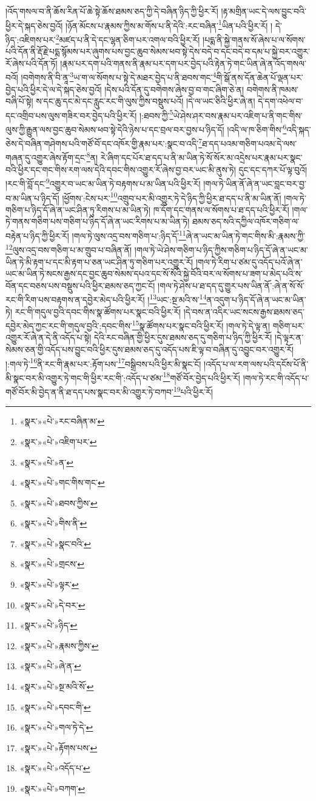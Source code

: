 །འོད་གསལ་བ་ནི་ཆོས་རིན་པོ་ཆེ་སྟེ་ཆོས་ཐམས་ཅད་ཀྱི་དེ་བཞིན་ཉིད་ཀྱི་ཕྱིར་རོ། །རྟ་མགྲིན་ཡང་དེ་ལས་བྱུང་བའི་ཕྱིར་དེ་སྐད་ཅེས་བྱའོ། །ཉོན་མོངས་པ་རྣམས་ཀྱིས་མ་གོས་པ་ནི་དེའི་:རང་བཞིན་\footnote{«སྣར་»«པེ་»རང་བཞིན་མ་}ཡིན་པའི་ཕྱིར་རོ། །
དེ་ཉིད་:འཇིགས་པར་\footnote{«སྣར་»«པེ་»འཇིག་པར་}མཛད་པ་ནི་དེ་དང་ལྷན་ཅིག་པར་འགལ་བའི་ཕྱིར་རོ། །པདྨ་ནི་སྐྱེ་གནས་སོ་ཞེས་པ་ལ་སོགས་པའི་དོན་ནི་རྡོ་རྗེ་པདྨ་སྙོམས་པར་ཞུགས་པས་བྱང་ཆུབ་སེམས་ཕབ་སྟེ་དེས་བདེ་བ་དང་བདེ་བ་དམ་པ་སྐྱེ་བར་འགྱུར་རོ་ཞེས་པའི་དོན་ཏོ། །རྣམ་པར་དག་པའི་གནས་ནི་རྣམ་པར་དག་པར་བྱེད་པའི་རྟེན་ཏེ་གང་ཡིན་ཞེ་ན་འོད་གསལ་བའོ། །བགེགས་ནི་བི་ནཱ་\footnote{«སྣར་»«པེ་»ན་}ཡ་ག་ལ་སོགས་པ་སྟེ་དེ་མཐར་བྱེད་པ་ནི་ཐབས་གང་\footnote{«སྣར་»«པེ་»གང་གིས་གང་}གི་སྒོ་ནས་དོན་ཆེན་པོ་ལྡན་པར་བྱེད་པའི་ཕྱིར་དེ་ལ་དེ་སྐད་ཅེས་བྱའོ། །དེས་པའི་དོན་དུ་བགེགས་ཞེས་བྱ་བ་གང་ཞིག་ཅེ་ན། བགེགས་ནི་ཁམས་བཞི་པོ་སྟེ། ས་དང་ཆུ་དང་མེ་དང་རླུང་རང་གི་ལུས་ཀྱིས་བསྡུས་པའོ། །དེ་ལ་ཡང་ཅིའི་ཕྱིར་ཞེ་ན། དེ་དག་འཕེལ་བ་དང་འགྲིབ་པས་ལུས་གཟིར་བར་བྱེད་པའི་ཕྱིར་རོ། །:ཐབས་ཀྱི་\footnote{«སྣར་»«པེ་»ཐབས་ཀྱིས་}ཡེ་ཤེས་ཤར་བས་རྣམ་པར་འཇིག་པ་ནི་གང་གིས་ལུས་ཀྱི་རྒྱུན་ལས་བྱང་ཆུབ་སེམས་ཕབ་སྟེ་དེའི་ཉེས་པ་དང་བྲལ་བར་བྱས་པ་ཉིད་དོ། །འདི་ལ་ཁ་ཅིག་གིས་\footnote{«སྣར་»«པེ་»གིས་ནི་}འདི་སྐད་ཅེས་དེ་བཞིན་གཤེགས་པའི་གཙོ་བོ་དང་འཁོར་གྱི་རྣམ་པར་:སྣང་བ་འདི་\footnote{«སྣར་»«པེ་»སྣང་བའི་}ཐ་དད་པའམ་གཅིག་པའམ་དེ་ལས་གཞན་དུ་འགྱུར་ཞེས་རྟོག་དྲང་\footnote{«སྣར་»«པེ་»གྲངས་}ན། རེ་ཞིག་དང་པོར་ཐ་དད་པ་ནི་མ་ཡིན་ཏེ་སོ་སོར་མ་འདྲེས་པར་རྣམ་པར་སྣང་བའི་ཕྱིར་དང་གང་གིས་རག་ལས་དེའི་དབང་གིས་འགྱུར་རོ་ཞེས་བྱ་བར་ཡང་མི་ནུས་ཏེ། དུང་དང་དཀར་པོ་ལྟ་བུའོ། །རང་གི་བློ་དང་\footnote{«སྣར་»«པེ་»ལྟར་}འགྱུར་བ་ཡང་མ་ཡིན་ཏེ་བརྟགས་པ་མ་ཡིན་པའི་ཕྱིར་རོ། །གལ་ཏེ་ཡིན་ནོ་ཞེ་ན་ཡང་བླང་བར་བྱ་བ་མ་ཡིན་པ་ཉིད་དོ། །ཕྱོགས་:ངེས་པར་\footnote{«སྣར་»«པེ་»དེ་བར་}འགྲུབ་པར་མི་འགྱུར་ཏེ་དེ་ཉིད་ཀྱི་ཕྱིར་ཐ་དད་པ་ནི་མ་ཡིན་ནོ། །གལ་ཏེ་གཅིག་པ་ཉིད་དོ་ཞེ་ན་ཡང་ཤིན་ཏུ་རིགས་པ་མ་ཡིན་ཏེ། ཁ་དོག་དང་གནས་ལ་སོགས་པ་ཐ་དད་པའི་ཕྱིར་རོ། །གལ་ཏེ་གནས་གཅིག་པས་གཅིག་པ་ཉིད་དོ་ཞེ་ན་ཡང་རིགས་པ་མ་ཡིན་ཏེ། ཐམས་ཅད་སའི་དཀྱིལ་འཁོར་གཅིག་ལ་བརྟེན་པ་ཉིད་ཀྱི་ཕྱིར་རོ། །གལ་ཏེ་ལུས་འདྲ་བས་གཅིག་པ་:ཉིད་དོ་\footnote{«སྣར་»«པེ་»ཉིད་}ཞེ་ན་ཡང་མ་ཡིན་ཏེ་གང་གིས་མི་:རྣམས་ཀྱི་\footnote{«སྣར་»«པེ་»རྣམས་ཀྱིས་}ལུས་འདྲ་བས་གཅིག་པ་མ་གྲུབ་པ་བཞིན་ནོ། །གལ་ཏེ་ཡེ་ཤེས་གཅིག་པ་ཉིད་ཀྱིས་གཅིག་པ་ཉིད་དོ་ཞེ་ན་ཡང་མ་ཡིན་ཏེ་མི་རྟག་པ་དང་མི་རྟག་པ་ཅན་ཡང་ཤིན་ཏུ་གཅིག་པར་འགྱུར་རོ། །གལ་ཏེ་རིག་པ་ཙམ་དུ་འདོད་པའོ་ཞེ་ན་ཡང་མ་ཡིན་ཏེ་སངས་རྒྱས་དང་བྱང་ཆུབ་སེམས་དཔའ་དང་སོ་སོའི་སྐྱེ་བོའི་བར་ལ་སོགས་པ་ཟག་པ་མེད་པའི་ས་བོན་དང་བཅས་པས་བསྡུས་པའི་ཕྱིར་ཐམས་ཅད་ཀྱང་ངོ། །གལ་ཏེ་ཤེས་པ་ཐ་དད་དུ་གྱུར་པས་ཡིན་ནོ་:ཞེ་ན་སོ་སོ་རང་གི་རིག་པས་བརྟགས་ན་དབྱེར་མེད་པའི་ཕྱིར་རོ། །\footnote{«སྣར་»«པེ་»ཞེ་ན་}ཡང་:སྔ་མའི་ས་\footnote{«སྣར་»«པེ་»སྔ་མའི་སོ་}ན་འདུག་པ་ཉིད་དོ་ཞེ་ན་ཡང་མ་ཡིན་ཏེ། རང་གི་གདུལ་བྱའི་དབང་གིས་སྣ་ཚོགས་པར་སྣང་བའི་ཕྱིར་རོ། །དེ་བས་ན་འདིར་ཡང་སངས་རྒྱས་ཐམས་ཅད་དབྱེར་མེད་ཀྱང་རང་གི་གདུལ་བྱའི་:དབང་གིས་\footnote{«སྣར་»«པེ་»དབང་གི་}སྣ་ཚོགས་པར་སྣང་བའི་ཕྱིར་རོ། །གལ་ཏེ་དེ་ལྟ་ན། གཅིག་པར་འགྱུར་རོ་ཞེ་ན་དེ་ནི་འདོད་པ་སྟེ། དེའི་རང་བཞིན་གྱི་ཕྱིར་དུས་ཐམས་ཅད་དུ་གཅིག་པ་ཉིད་ཀྱི་ཕྱིར་རོ། །དེ་ལྟར་ན་སེམས་ཅན་གྱི་འདོད་པས་བྱུང་བའི་ཕྱིར་དུས་ཐམས་ཅད་དུ་འདོད་པས་ཇི་ལྟ་བ་བཞིན་དུ་འབྱུང་བར་འགྱུར་རོ། །:གལ་ཏེ་\footnote{«སྣར་»«པེ་»གལ་ཏེ་དེ་}ནི་རང་གི་རྣམ་པར་:རྟོག་པས་\footnote{«སྣར་»«པེ་»རྟོགས་པས་}བསྒྲིབས་པའི་ཕྱིར་མི་སྣང་ངོ། །འདོད་པ་ལ་རག་ལས་པའི་དངོས་པོ་ནི་མི་སྣང་བར་མི་འགྱུར་ཏེ་གང་གི་ཕྱིར་རང་གི་:འདོད་པ་ཙམ་\footnote{«སྣར་»«པེ་»འདོད་པ་}གཙོ་བོར་བྱེད་པའི་ཕྱིར་རོ། །གལ་ཏེ་རང་གི་འདོད་པ་གཙོ་བོར་མི་བྱེད་ན་ནི་ཐ་དད་པས་སྣང་བར་མི་འགྱུར་ཏེ་བཀབ་\footnote{«སྣར་»«པེ་»བཀག་}པའི་ཕྱིར་རོ། 